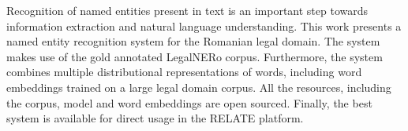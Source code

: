 Recognition of named entities present in text is an important step towards information extraction and natural language understanding. This work presents a named entity recognition system for the Romanian legal domain. The system makes use of the gold annotated LegalNERo corpus. Furthermore, the system combines multiple distributional representations of words, including word embeddings trained on a large legal domain corpus. All the resources, including the corpus, model and word embeddings are open sourced. Finally, the best system is available for direct usage in the RELATE platform.
